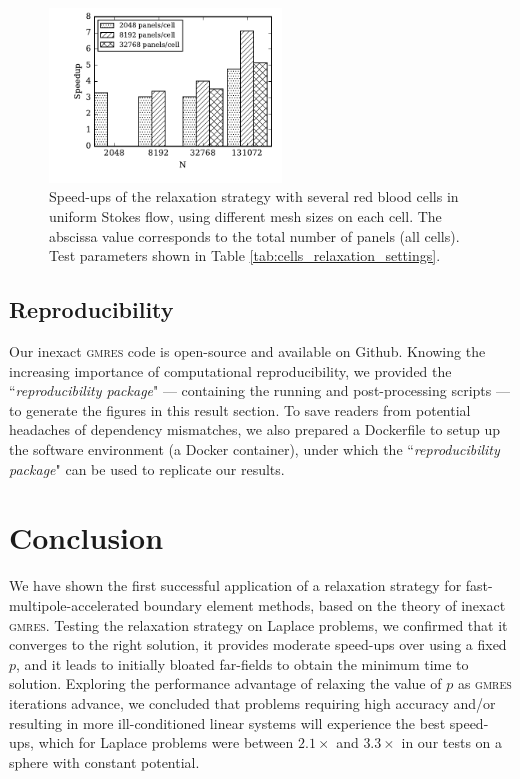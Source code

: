 \documentclass[final,3p,times]{elsarticle}
\newcommand{\gmres}{\textsc{gmres}\xspace}
\begin{document}
\begin{figure}[ht]
\begin{center}
	\includegraphics[natwidth=4in,natheight=3in,width=0.55\textwidth]{EthrocyteMultipleCellSpeedup.pdf}
	\caption{Speed-ups of the relaxation strategy with several red blood cells in uniform Stokes flow, using different mesh sizes on each cell. The abscissa value corresponds to the total number of panels (all cells). Test parameters shown in Table \ref{tab:cells_relaxation_settings}.}
	\label{fig:multiple_cell_speedup}
\end{center}
\end{figure}

\subsection{Reproducibility}

Our inexact \gmres code is open-source and available on Github. Knowing the increasing importance of computational reproducibility, we provided the ``\textit{reproducibility package}" --- containing the running and post-processing scripts --- to generate the figures in this result section. To save readers from potential headaches of dependency mismatches, we also prepared a Dockerfile to setup up the software environment (a Docker container), under which the ``\textit{reproducibility package}" can be used to replicate our results.


\section{Conclusion} 

We have shown the first successful application of a relaxation strategy for fast-multipole-accelerated boundary element methods, based on the theory of inexact \gmres. Testing the relaxation strategy on Laplace problems, we confirmed that it converges to the right solution, it provides moderate speed-ups over using a fixed $p$, and it leads to initially bloated far-fields to obtain the minimum time to solution.
Exploring the performance advantage of relaxing the value of $p$ as \gmres iterations advance, we concluded that problems requiring high accuracy and/or resulting in more ill-conditioned linear systems will experience the best speed-ups, which for Laplace problems were between $2.1\times$ and $3.3\times$ in our tests on a sphere with constant potential.
\end{document}
